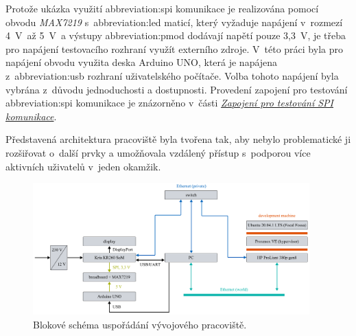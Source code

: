 \documentclass[a4paper, twoside, 11pt]{article}
\newcommand{\fbar}{\FloatBarrier}
\begin{document}
	Protože ukázka využití \gls{abbreviation:spi} komunikace je realizována pomocí obvodu \textit{MAX7219} s~\gls{abbreviation:led} maticí, který vyžaduje napájení v~rozmezí 4~V~až 5~V~a výstupy \gls{abbreviation:pmod} dodávají napětí pouze 3,3~V, je třeba pro napájení testovacího rozhraní využít externího zdroje. V~této práci byla pro napájení obvodu využita deska Arduino UNO, která je napájena z~\gls{abbreviation:usb} rozhraní uživatelského počítače. Volba tohoto napájení byla vybrána z~důvodu jednoduchosti a dostupnosti. Provedení zapojení pro testování \gls{abbreviation:spi} komunikace je znázorněno v~části \hyperref[subsubsec:zapojeni-pro-testovani-spi-komunikace]{\textit{Zapojení pro testování SPI komunikace}}.\par
	Představená architektura pracoviště byla tvořena tak, aby nebylo problematické ji rozšiřovat o~další prvky a umožňovala vzdálený přístup s~podporou více aktivních uživatelů v~jeden okamžik.


\begin{figure}[htbp!]
	\centering
	\includegraphics[width=0.95\textwidth]{src/pdf/workspace-scheme.pdf}
	\caption{Blokové schéma uspořádání vývojového pracoviště.}
	\label{fig:workspace-scheme}
\end{figure}

	\fbar
\end{document}
